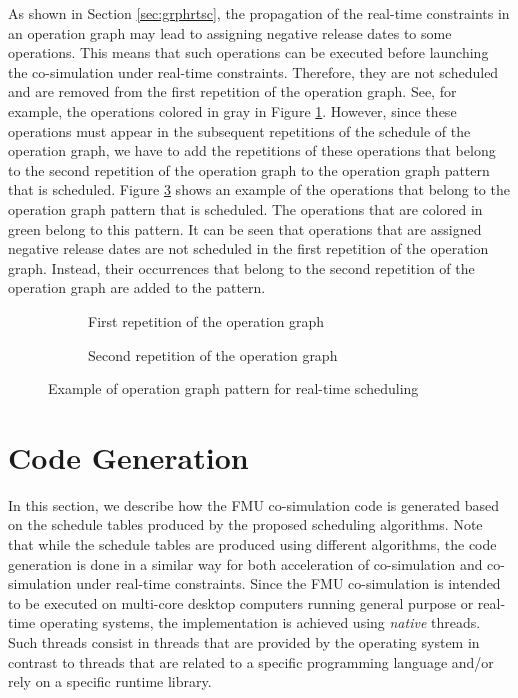
As shown in Section \ref{sec:grphrtsc}, the propagation of the real-time constraints in an operation graph may lead to assigning negative release dates to some operations. This means that such operations can be executed before launching the co-simulation under real-time constraints. Therefore, they are not scheduled and are removed from the first repetition of the operation graph. See, for example, the operations colored in gray in Figure \ref{fig:rep1}. However, since these operations must appear in the subsequent repetitions of the schedule of the operation graph, we have to add the repetitions of these operations that belong to the second repetition of the operation graph to the operation graph pattern that is scheduled. Figure \ref{fig:schedpattern} shows an example of the operations that belong to the operation graph pattern that is scheduled. The operations that are colored in green belong to this pattern. It can be seen that operations that are assigned negative release dates are not scheduled in the first repetition of the operation graph. Instead, their occurrences that belong to the second repetition of the operation graph are added to the pattern.

\begin{figure}[phtb]
\centering
\begin{subfigure}{\textwidth}
  \centering
  
  \caption{First repetition of the operation graph}
  \label{fig:rep1}
\end{subfigure}

\begin{subfigure}{\textwidth}
  \centering
  
  \caption{Second repetition of the operation graph}
  \label{fig:rep2}
\end{subfigure}
\caption{Example of operation graph pattern for real-time scheduling}
\label{fig:schedpattern}
\end{figure}

\section{Code Generation}

In this section, we describe how the FMU co-simulation code is generated based on the schedule tables produced by the proposed scheduling algorithms. Note that while the schedule tables are produced using different algorithms, the code generation is done in a similar way for both acceleration of co-simulation and co-simulation under real-time constraints. Since the FMU co-simulation is intended to be executed on multi-core desktop computers running general purpose or real-time operating systems, the implementation is achieved using \textit{native} threads. Such threads consist in threads that are provided by the operating system in contrast to threads that are related to a specific programming language and/or rely on a specific runtime library.

